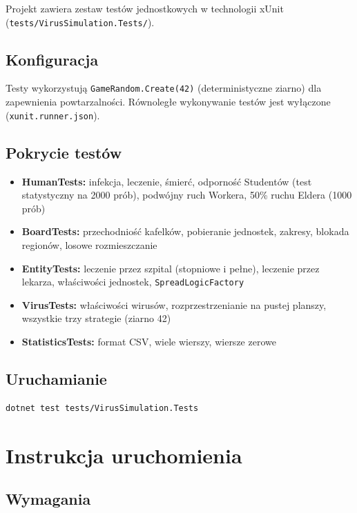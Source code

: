 \documentclass[a4paper,12pt]{article}
\begin{document}
Projekt zawiera zestaw testów jednostkowych w technologii xUnit
(\texttt{tests/VirusSimulation.Tests/}).

\subsection{Konfiguracja}

Testy wykorzystują \texttt{GameRandom.Create(42)} (deterministyczne ziarno) dla
zapewnienia powtarzalności. Równoległe wykonywanie testów jest wyłączone
(\texttt{xunit.runner.json}).

\subsection{Pokrycie testów}

\begin{itemize}
    \item \textbf{HumanTests:} infekcja, leczenie, śmierć, odporność Studentów (test statystyczny
          na 2000 prób), podwójny ruch Workera, 50\% ruchu Eldera (1000 prób)
    \item \textbf{BoardTests:} przechodniość kafelków, pobieranie jednostek, zakresy,
          blokada regionów, losowe rozmieszczanie
    \item \textbf{EntityTests:} leczenie przez szpital (stopniowe i pełne), leczenie przez
          lekarza, właściwości jednostek, \texttt{SpreadLogicFactory}
    \item \textbf{VirusTests:} właściwości wirusów, rozprzestrzenianie na pustej planszy,
          wszystkie trzy strategie (ziarno 42)
    \item \textbf{StatisticsTests:} format CSV, wiele wierszy, wiersze zerowe
\end{itemize}

\subsection{Uruchamianie}

\begin{lstlisting}[frame=single, numbers=none, basicstyle=\ttfamily\small]
dotnet test tests/VirusSimulation.Tests
\end{lstlisting}

\section{Instrukcja uruchomienia}

\subsection{Wymagania}
\end{document}
